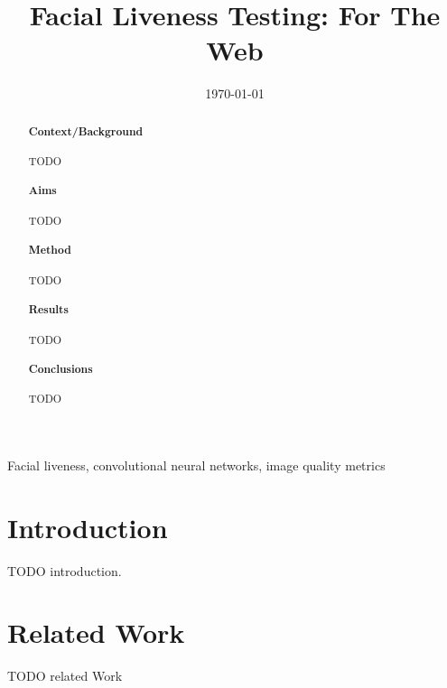 \documentclass[10pt,a4paper]{article}
\title{Facial Liveness Testing: For The Web}
\author{} %
\date{\today}
\begin{document}
\maketitle

\begin{abstract}

\paragraph{Context/Background}
    TODO

\paragraph{Aims}
    TODO

\paragraph{Method}
    TODO

\paragraph{Results}
    TODO
\paragraph{Conclusions}
    TODO

\end{abstract}

\begin{keywords}
Facial liveness, convolutional neural networks, image quality metrics
\end{keywords}

\section{Introduction}
    TODO introduction.

\section{Related Work}
    TODO related Work
\end{document}
